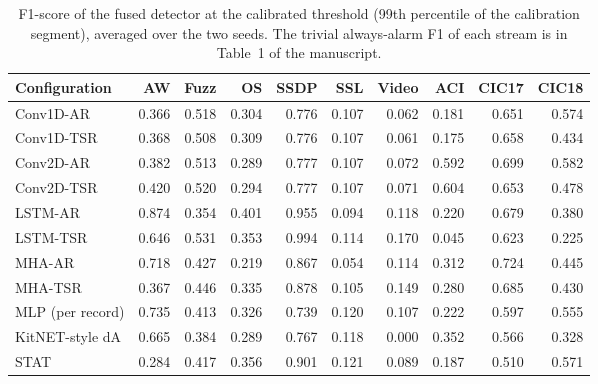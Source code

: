 \begin{table}[ht]\centering\footnotesize\setlength{\tabcolsep}{3.5pt}
\begin{tabular}{lrrrrrrrrr}
\hline
\textbf{Configuration} & \textbf{AW} & \textbf{Fuzz} & \textbf{OS} & \textbf{SSDP} & \textbf{SSL} & \textbf{Video} & \textbf{ACI} & \textbf{CIC17} & \textbf{CIC18}\\
\hline
Conv1D-AR & 0.366 & 0.518 & 0.304 & 0.776 & 0.107 & 0.062 & 0.181 & 0.651 & 0.574\\
Conv1D-TSR & 0.368 & 0.508 & 0.309 & 0.776 & 0.107 & 0.061 & 0.175 & 0.658 & 0.434\\
Conv2D-AR & 0.382 & 0.513 & 0.289 & 0.777 & 0.107 & 0.072 & 0.592 & 0.699 & 0.582\\
Conv2D-TSR & 0.420 & 0.520 & 0.294 & 0.777 & 0.107 & 0.071 & 0.604 & 0.653 & 0.478\\
LSTM-AR & 0.874 & 0.354 & 0.401 & 0.955 & 0.094 & 0.118 & 0.220 & 0.679 & 0.380\\
LSTM-TSR & 0.646 & 0.531 & 0.353 & 0.994 & 0.114 & 0.170 & 0.045 & 0.623 & 0.225\\
MHA-AR & 0.718 & 0.427 & 0.219 & 0.867 & 0.054 & 0.114 & 0.312 & 0.724 & 0.445\\
MHA-TSR & 0.367 & 0.446 & 0.335 & 0.878 & 0.105 & 0.149 & 0.280 & 0.685 & 0.430\\
MLP (per record) & 0.735 & 0.413 & 0.326 & 0.739 & 0.120 & 0.107 & 0.222 & 0.597 & 0.555\\
KitNET-style dA & 0.665 & 0.384 & 0.289 & 0.767 & 0.118 & 0.000 & 0.352 & 0.566 & 0.328\\
STAT & 0.284 & 0.417 & 0.356 & 0.901 & 0.121 & 0.089 & 0.187 & 0.510 & 0.571\\
\hline
\end{tabular}
\caption{F1-score of the fused detector at the calibrated threshold (99th percentile of the calibration segment), averaged over the two seeds. The trivial always-alarm F1 of each stream is in Table~1 of the manuscript.}\label{tab:s_f1}
\end{table}

